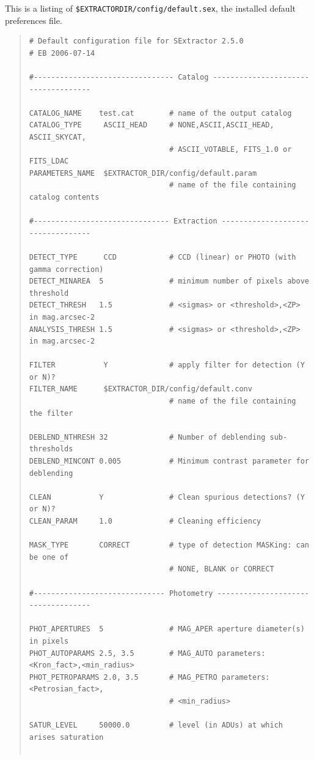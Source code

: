 \documentclass[twoside,11pt]{article}
\renewcommand{\_}{\texttt{\symbol{95}}}
\begin{document}
This is a listing of \texttt{\$EXTRACTOR\_DIR/config/default.sex}, the
installed default preferences file.
\small
\begin{quote} \begin{verbatim}
# Default configuration file for SExtractor 2.5.0
# EB 2006-07-14

#-------------------------------- Catalog ------------------------------------

CATALOG_NAME    test.cat        # name of the output catalog
CATALOG_TYPE     ASCII_HEAD     # NONE,ASCII,ASCII_HEAD, ASCII_SKYCAT,
                                # ASCII_VOTABLE, FITS_1.0 or FITS_LDAC
PARAMETERS_NAME  $EXTRACTOR_DIR/config/default.param
                                # name of the file containing catalog contents

#------------------------------- Extraction ----------------------------------

DETECT_TYPE      CCD            # CCD (linear) or PHOTO (with gamma correction)
DETECT_MINAREA  5               # minimum number of pixels above threshold
DETECT_THRESH   1.5             # <sigmas> or <threshold>,<ZP> in mag.arcsec-2
ANALYSIS_THRESH 1.5             # <sigmas> or <threshold>,<ZP> in mag.arcsec-2

FILTER           Y              # apply filter for detection (Y or N)?
FILTER_NAME      $EXTRACTOR_DIR/config/default.conv
                                # name of the file containing the filter

DEBLEND_NTHRESH 32              # Number of deblending sub-thresholds
DEBLEND_MINCONT 0.005           # Minimum contrast parameter for deblending

CLEAN           Y               # Clean spurious detections? (Y or N)?
CLEAN_PARAM     1.0             # Cleaning efficiency

MASK_TYPE       CORRECT         # type of detection MASKing: can be one of
                                # NONE, BLANK or CORRECT

#------------------------------ Photometry -----------------------------------

PHOT_APERTURES  5               # MAG_APER aperture diameter(s) in pixels
PHOT_AUTOPARAMS 2.5, 3.5        # MAG_AUTO parameters: <Kron_fact>,<min_radius>
PHOT_PETROPARAMS 2.0, 3.5       # MAG_PETRO parameters: <Petrosian_fact>,
                                # <min_radius>

SATUR_LEVEL     50000.0         # level (in ADUs) at which arises saturation


\end{verbatim}
\end{quote}
\end{document}
